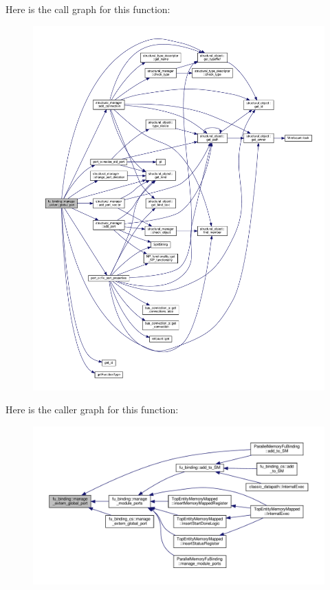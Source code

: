 Here is the call graph for this function\+:
\nopagebreak
\begin{figure}[H]
\begin{center}
\leavevmode
\includegraphics[width=350pt]{d8/d04/classfu__binding_a8998894fb4f6429cac9792309187e000_cgraph}
\end{center}
\end{figure}
Here is the caller graph for this function\+:
\nopagebreak
\begin{figure}[H]
\begin{center}
\leavevmode
\includegraphics[width=350pt]{d8/d04/classfu__binding_a8998894fb4f6429cac9792309187e000_icgraph}
\end{center}
\end{figure}
\mbox{\label{classfu__binding_a52c3185e5ef4afdfe83a634eee516fcc}} 
